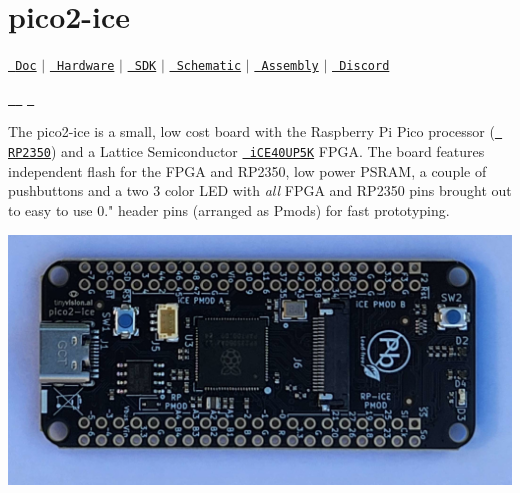 \chapter{pico2-\/ice}
\hypertarget{index}{}\label{index}
\label{index_md_index}%
%
 \href{http://pico2-ice.tinyvision.ai/}{\texttt{ Doc}} \texorpdfstring{$\vert$}{|} \href{https://github.com/tinyvision-ai-inc/pico2-ice}{\texttt{ Hardware}} \texorpdfstring{$\vert$}{|} \href{https://github.com/tinyvision-ai-inc/pico-ice-sdk}{\texttt{ SDK}} \texorpdfstring{$\vert$}{|} \href{https://raw.githubusercontent.com/tinyvision-ai-inc/pico2-ice/docs/Board/Rev1/pico2-ice.pdf}{\texttt{ Schematic}} \texorpdfstring{$\vert$}{|} \href{https://htmlpreview.github.io/?https://github.com/tinyvision-ai-inc/pico-ice/blob/docs/Board/Rev1/bom/pico2-ice_ibom.html}{\texttt{ Assembly}} \texorpdfstring{$\vert$}{|} \href{https://discord.gg/t2CzbAYeD2}{\texttt{ Discord}}

\href{https://www.elecrow.com/pico-ice-rp2040-plus-lattice-ice40up5k-fpga.html}{\texttt{ }} \href{https://lectronz.com/stores/tinyvision-ai-store}{\texttt{ }} \href{https://www.tindie.com/stores/tinyvision_ai/?ref=offsite_badges&utm_source=sellers_vr2045&utm_medium=badges&utm_campaign=badge_small\%22\%3E}{\texttt{ }}

The pico2-\/ice is a small, low cost board with the Raspberry Pi Pico processor (\href{https://www.raspberrypi.com/documentation/microcontrollers/silicon.html\#rp2350}{\texttt{ RP2350}}) and a Lattice Semiconductor \href{https://www.latticesemi.com/en/Products/FPGAandCPLD/iCE40UltraPlus}{\texttt{ i\+CE40\+UP5K}} FPGA. The board features independent flash for the FPGA and RP2350, low power PSRAM, a couple of pushbuttons and a two 3 color LED with {\itshape all} FPGA and RP2350 pins brought out to easy to use 0."{} header pins (arranged as Pmod\textquotesingle{}s) for fast prototyping.

 
\begin{DoxyInlineImage}
\includegraphics[height=\baselineskip,keepaspectratio=true]{pico2_ice_front.jpg}
\end{DoxyInlineImage}
   

